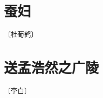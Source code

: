 \documentclass[12pt,UTF-8,openany]{ctexbook}
\begin{document}
\vspace{8pt}


\section{蚕妇}

\begin{center}
    \vspace{10pt}
    
    \begin{normalsize}
        
        〔杜荀鹤〕
        
    \end{normalsize}
    
    \vspace{8pt}
    
    \begin{large}
        
        
        
    \end{large}
    
\end{center}

\vspace{8pt}


\section{送孟浩然之广陵}

\begin{center}
    \vspace{10pt}
    
    \begin{normalsize}
        
        〔李白〕
        
    \end{normalsize}
    
    \vspace{8pt}
    
    \begin{large}
        
        
        
    \end{large}
    
\end{center}
\end{document}

